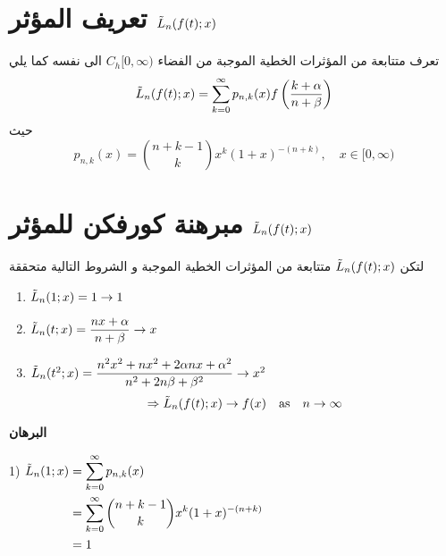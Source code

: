 \section{تعريف المؤثر $\tilde{L}_n(f(t);x)$}
تعرف متتابعة من المؤثرات الخطية الموجبة من الفضاء $C_h[0, \infty)$ الى نفسه كما يلي
\[
\tilde{L}_n(f(t); x) = \sum_{k=0}^{\infty} p_{n, k}(x) f\left(\frac{k+\alpha}{n+\beta}\right)
\]
حيث
\[
p_{n,k} (x) = \binom{n+k-1}{k} x^k (1+x)^{-(n+k)}, \quad x \in [0, \infty)
\]

\section{مبرهنة كورفكن للمؤثر $\tilde{L}_n(f(t); x)$}
لتكن $\tilde{L}_n(f(t);x)$ متتابعة من المؤثرات الخطية الموجبة  و الشروط التالية متحققة
\begin{english}
	\begin{enumerate}[label=\arabic*)]
		\item $\tilde{L}_n(1;x)=1 \to 1$
		\item $\tilde{L}_n(t;x) = \dfrac{nx + \alpha}{n + \beta} \to x$
		\item $\tilde{L}_n(t^2;x) = \dfrac{n^2x^2 + nx^2 + 2\alpha n x + \alpha^2}{n^2 + 2n\beta+ \beta^2} \to x^2$
		\[
		\Rightarrow\tilde{L}_n(f(t);x) \to f(x) \quad\text{as}\quad n\to \infty
		\]
	\end{enumerate}
\end{english}
\noindent
\textbf{البرهان}

\begin{english}
1) $	\begin{aligned}[t]
		\tilde{L}_n(1; x) &= \sum_{k=0}^{\infty} p_{n,k}(x)\\
		&= \sum_{k=0}^{\infty}\binom{n+k-1}{k} x^k (1+x)^{-(n+k)} \\
		&=1
	\end{aligned}$
\end{english}

